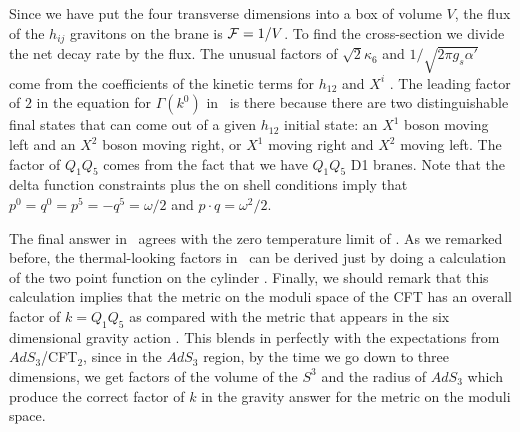 
Since we have  put the four transverse dimensions
into a box of volume $V$, 
 the flux of the $h_{ij}$ gravitons on the brane is
${\cal F} = 1/V$. 
 To find the cross-section
we divide the net decay rate   by the flux.
The unusual factors of $ \sqrt{2} \kappa_6$
 and $1/\sqrt{ 2 \pi g_s \alpha'}$ 
come from the coefficients of the kinetic
terms for $h_{12}$ and $X^i$ \normac \donebi . 
  The leading factor of $2$ in the equation for $\Gamma(k^0)$
in \FermiThermal\ is there because there are two distinguishable final
states that can come out of a given $h_{12}$ initial state: an $X^1$ boson
moving left and an $X^2$ boson moving right, or $X^1$ moving right and
$X^2$ moving left. The factor of $Q_1Q_5$ comes from the fact that we
have $Q_1Q_5$ D1 branes.  Note that the delta function constraints
plus the on shell conditions imply that $ p^0 =q^0=p^5=-q^5 =\omega/2$
and $p\cdot q = \omega^2/2$. 

The final answer in \FermiThermal\ agrees with the zero temperature
limit of \absor . As we remarked before, the thermal-looking
factors in \absor\ can be derived just by doing a calculation of
the two point function on the cylinder  \cite{Maldacena:1997ih}. 
Finally, we should remark that this calculation implies that
the metric on the moduli space of the CFT has an overall factor of 
$k=Q_1Q_5$
as compared with the metric that appears in the six dimensional gravity
action \lagrangr . This blends in perfectly with the expectations
from $AdS_3$/CFT${}_2$, since in the $AdS_3$ region, by the time we go 
down to three dimensions, we get factors of the volume of the $S^3$ 
and the radius of $AdS_3$ which produce the correct factor of $k$ 
in the gravity answer for the metric on the moduli space. 

